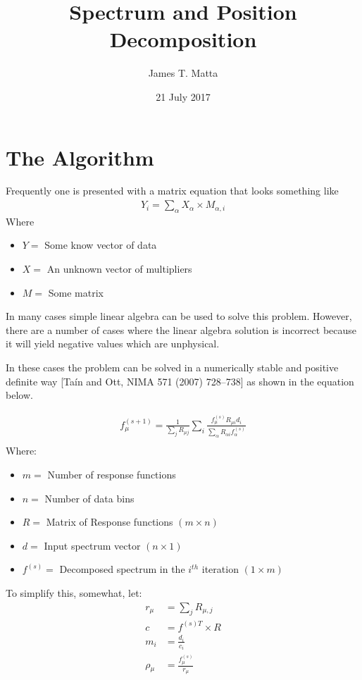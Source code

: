 \documentclass{article}
\begin{document}
\title{Spectrum and Position Decomposition}
\author{James T. Matta}
\date{21 July 2017}
\maketitle
\tableofcontents

\section{The Algorithm}
Frequently one is presented with a matrix equation that looks something like
\begin{align}
	Y_{i} = \sum\limits_{\alpha}X_{\alpha}\times{}M_{\alpha,i}
\end{align}
Where
\begin{itemize}
\item $Y=$ Some know vector of data
\item $X=$ An unknown vector of multipliers
\item $M=$ Some matrix
\end{itemize}

In many cases simple linear algebra can be used to solve this problem. However, there are a number of cases where the linear algebra solution is incorrect because it will yield negative values which are unphysical.

In these cases the problem can be solved in a numerically stable and positive definite way [Taín and Ott, NIMA 571 (2007) 728–738] as shown in the equation below.

\begin{align}
	f_{\mu}^{(s+1)} = \frac{1}{\sum\limits_{j}R_{\mu{}j}} \sum\limits_{i}\frac{f_{\mu{}}^{(s)} R_{\mu{}i}d_i}{\sum\limits_{\alpha}R_{\alpha{}i}f_{\alpha}^{(s)}} \\
\end{align}
Where:
\begin{itemize}
\item $m=$ Number of response functions
\item $n=$ Number of data bins
\item $R=$ Matrix of Response functions $(m \times n)$
\item $d=$ Input spectrum vector $(n \times 1)$
\item $f^{(s)}=$ Decomposed spectrum in the $i^{th}$ iteration $(1 \times m)$
\end{itemize}

To simplify this, somewhat, let:
\begin{align}
r_{\mu} & = \sum\limits_{j}R_{\mu{},j} \\
c & = f^{(s)T}\times{}R\\
m_i &= \frac{d_i}{c_i}\\
\rho{}_{\mu{}} & = \frac{f_{\mu}^{(s)}}{r_{\mu}}
\end{align}
\end{document}
